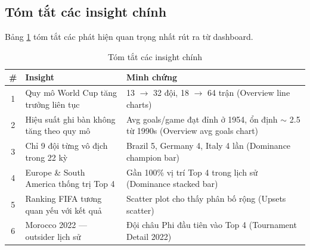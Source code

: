 \documentclass[12pt,a4paper]{article}
\begin{document}
\subsection{Tóm tắt các insight chính}
Bảng \ref{tab:insight_summary} tóm tắt các phát hiện quan trọng nhất rút ra từ dashboard.

\begin{table}[H]
\centering
\caption{Tóm tắt các insight chính}
\label{tab:insight_summary}
\begin{tabular}{clp{8.5cm}}
\toprule
\textbf{\#} & \textbf{Insight} & \textbf{Minh chứng} \\
\midrule
1 & Quy mô World Cup tăng trưởng liên tục & 13 $\rightarrow$ 32 đội, 18 $\rightarrow$ 64 trận (Overview line charts) \\
2 & Hiệu suất ghi bàn không tăng theo quy mô & Avg goals/game đạt đỉnh ở 1954, ổn định $\sim$ 2.5 từ 1990s (Overview avg goals chart) \\
3 & Chỉ 9 đội từng vô địch trong 22 kỳ & Brazil 5, Germany 4, Italy 4 lần (Dominance champion bar) \\
4 & Europe \& South America thống trị Top 4 & Gần 100\% vị trí Top 4 trong lịch sử (Dominance stacked bar) \\
5 & Ranking FIFA tương quan yếu với kết quả & Scatter plot cho thấy phân bố rộng (Upsets scatter) \\
6 & Morocco 2022 --- outsider lịch sử & Đội châu Phi đầu tiên vào Top 4 (Tournament Detail 2022) \\
\bottomrule
\end{tabular}
\end{table}
\end{document}
